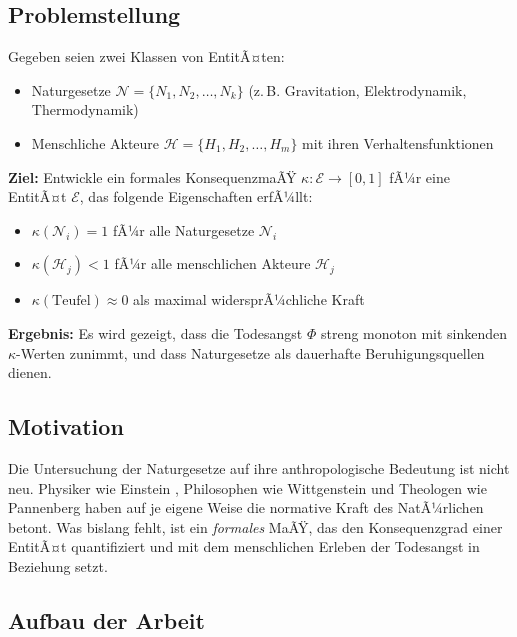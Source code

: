 ﻿\documentclass[a4paper,12pt]{article}
\theoremstyle{definition}
\begin{document}
\subsection{Problemstellung}

Gegeben seien zwei Klassen von EntitÃ¤ten:

\begin{itemize}
\item Naturgesetze $\mathcal{N} = \{N_1, N_2, \ldots, N_k\}$ (z.\,B. Gravitation, Elektrodynamik, Thermodynamik)
\item Menschliche Akteure $\mathcal{H} = \{H_1, H_2, \ldots, H_m\}$ mit ihren Verhaltensfunktionen
\end{itemize}

\textbf{Ziel:} Entwickle ein formales KonsequenzmaÃŸ $\kappa: \mathcal{E} \to [0,1]$ fÃ¼r eine EntitÃ¤t $\mathcal{E}$, das folgende Eigenschaften erfÃ¼llt:
\begin{itemize}
\item $\kappa(\mathcal{N}_i) = 1$ fÃ¼r alle Naturgesetze $\mathcal{N}_i$
\item $\kappa(\mathcal{H}_j) < 1$ fÃ¼r alle menschlichen Akteure $\mathcal{H}_j$
\item $\kappa(\text{Teufel}) \approx 0$ als maximal widersprÃ¼chliche Kraft
\end{itemize}

\textbf{Ergebnis:} Es wird gezeigt, dass die Todesangst $\Phi$ streng monoton mit sinkenden $\kappa$-Werten zunimmt, und dass Naturgesetze als dauerhafte Beruhigungsquellen dienen.

\subsection{Motivation}

Die Untersuchung der Naturgesetze auf ihre anthropologische Bedeutung ist nicht neu. Physiker wie Einstein \cite{einstein1916}, Philosophen wie Wittgenstein \cite{wittgenstein1921} und Theologen wie Pannenberg \cite{pannenberg1993} haben auf je eigene Weise die normative Kraft des NatÃ¼rlichen betont. Was bislang fehlt, ist ein \emph{formales} MaÃŸ, das den Konsequenzgrad einer EntitÃ¤t quantifiziert und mit dem menschlichen Erleben der Todesangst in Beziehung setzt.

\subsection{Aufbau der Arbeit}
\end{document}
